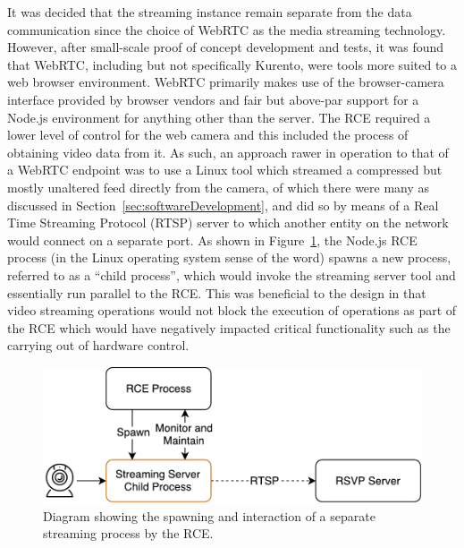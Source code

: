            It was decided that the streaming instance remain separate from the data communication since the choice of WebRTC as the media streaming technology. However, after small-scale proof of concept development and tests, it was found that WebRTC, including but not specifically Kurento, were tools more suited to a web browser environment. WebRTC primarily makes use of the browser-camera interface provided by browser vendors and fair but above-par support for a Node.js environment for anything other than the server. The RCE required a lower level of control for the web camera and this included the process of obtaining video data from it. As such, an approach rawer in operation to that of a WebRTC endpoint was to use a Linux tool which streamed a compressed but mostly unaltered feed directly from the camera, of which there were many as discussed in Section~\ref{sec:softwareDevelopment}, and did so by means of a Real Time Streaming Protocol (RTSP) server to which another entity on the network would connect on a separate port. As shown in Figure~\ref{fig:softDesign-commStreamingDesign}, the Node.js RCE process (in the Linux operating system sense of the word) spawns a new process, referred to as a ``child process'', which would invoke the streaming server tool and essentially run parallel to the RCE. This was beneficial to the design in that video streaming operations would not block the execution of operations as part of the RCE which would have negatively impacted critical functionality such as the carrying out of hardware control.
           
           \begin{figure}[h!]
             \centering
             \includegraphics[width=0.6\linewidth]{figures/softDesign-commStreamingDesign}
             \caption[Diagram showing the spawning and interaction of a separate streaming process by the RCE.]{Diagram showing the spawning and interaction of a separate streaming process by the RCE.}
             \label{fig:softDesign-commStreamingDesign}
           \end{figure}

